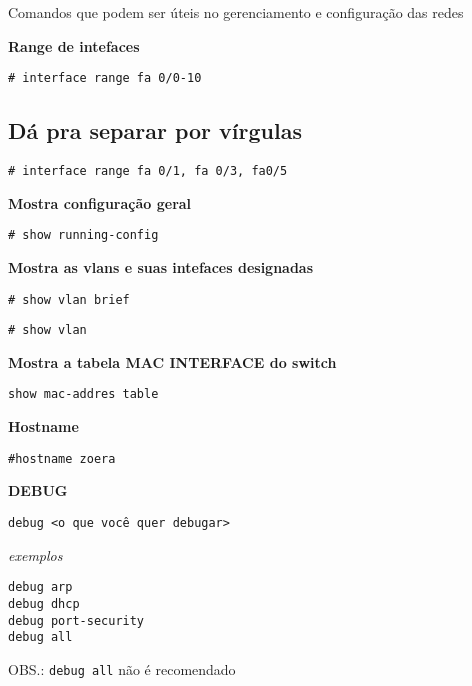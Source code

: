 \documentclass[]{article}
\begin{document}
Comandos que podem ser úteis no gerenciamento e configuração das redes

\textbf{Range de intefaces}

\begin{verbatim}
# interface range fa 0/0-10
\end{verbatim}

\hypertarget{duxe1-pra-separar-por-vuxedrgulas}{%
\subsection{Dá pra separar por
vírgulas}\label{duxe1-pra-separar-por-vuxedrgulas}}

\begin{verbatim}
# interface range fa 0/1, fa 0/3, fa0/5
\end{verbatim}

\textbf{Mostra configuração geral}

\begin{verbatim}
# show running-config
\end{verbatim}

\textbf{Mostra as vlans e suas intefaces designadas}

\begin{verbatim}
# show vlan brief
\end{verbatim}

\begin{verbatim}
# show vlan
\end{verbatim}

\textbf{Mostra a tabela MAC \textbar{} INTERFACE do switch}

\begin{verbatim}
show mac-addres table
\end{verbatim}

\textbf{Hostname}

\begin{verbatim}
#hostname zoera
\end{verbatim}

\textbf{DEBUG}

\begin{verbatim}
debug <o que você quer debugar>
\end{verbatim}

\emph{exemplos}

\begin{verbatim}
debug arp
debug dhcp
debug port-security
debug all
\end{verbatim}

OBS.: \texttt{debug\ all} não é recomendado
\end{document}

